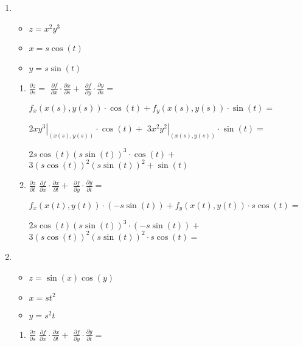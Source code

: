 \documentclass[../practica_04.tex]{subfiles}
\begin{document}
    \begin{enumerate}
        \item 
            \begin{itemize}
                \item $ z = x^2y^3 $
                \item $ x = s\cos(t) $
                \item $ y = s\sin(t) $
            \end{itemize}

            \begin{enumerate}
                \item $\frac{\partial z}{\partial s} = $
                    $ \frac{\partial f}{\partial x} \cdot \frac{\partial x}{\partial s} + $
                    $ \frac{\partial f}{\partial y} \cdot \frac{\partial y}{\partial s} = $

                    $ f_x(x(s),y(s)) \cdot \cos(t) + f_y(x(s),y(s)) \cdot \sin(t) = $

                    $ \left. 2xy^3 \right|_{(x(s),y(s))} \cdot \cos(t) + $
                    $ \left. 3x^2y^2 \right|_{(x(s),y(s))} \cdot \sin(t) = $

                    $ 2s\cos(t)(s\sin(t))^3 \cdot \cos(t) + $
                    $ 3(s\cos(t))^2(s\sin(t))^2 + \sin(t) $

                \item $\frac{\partial z}{\partial t}$
                    $ \frac{\partial f}{\partial x} \cdot \frac{\partial x}{\partial t} + $
                    $ \frac{\partial f}{\partial y} \cdot \frac{\partial y}{\partial t} = $

                    $ f_x(x(t),y(t)) \cdot (-s\sin(t)) + f_y(x(t),y(t)) \cdot s\cos(t) = $

                    $ 2s\cos(t)(s\sin(t))^3 \cdot (-s\sin(t)) + $
                    $ 3(s\cos(t))^2(s\sin(t))^2 \cdot s\cos(t) = $
            \end{enumerate}

        \item 
            \begin{itemize}
                \item $ z = \sin(x)\cos(y) $
                \item $ x = st^2 $
                \item $ y = s^2t $
            \end{itemize}

            \begin{enumerate}
                \item $\frac{\partial z}{\partial s}$
                    $ \frac{\partial f}{\partial x} \cdot \frac{\partial x}{\partial t} + $
                    $ \frac{\partial f}{\partial y} \cdot \frac{\partial y}{\partial t} = $


\end{enumerate}
\end{enumerate}
\end{document}
